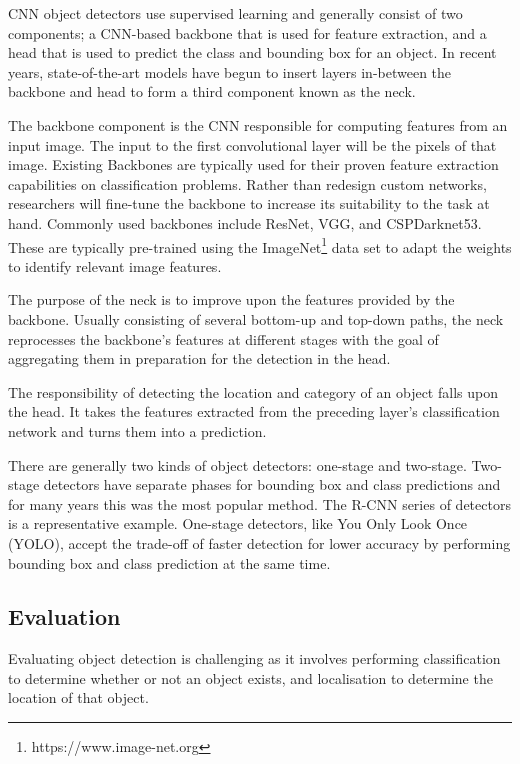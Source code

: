 \documentclass{thesis}
\begin{document}
CNN object detectors use supervised learning and generally consist of two components; a CNN-based backbone that is used for feature extraction, and a head that is used to predict the class and bounding box for an object. In recent years, state-of-the-art models have begun to insert layers in-between the backbone and head to form a third component known as the neck.

The backbone component is the CNN responsible for computing features from an input image. The input to the first convolutional layer will be the pixels of that image. Existing Backbones are typically used for their proven feature extraction capabilities on classification problems. Rather than redesign custom networks, researchers will fine-tune the backbone to increase its suitability to the task at hand. Commonly used backbones include ResNet, VGG, and CSPDarknet53\cite{zhu2021tphyolov5}. These are typically pre-trained using the ImageNet\footnote{https://www.image-net.org} data set to adapt the weights to identify relevant image features\cite{breakdown-yolo4}.

The purpose of the neck is to improve upon the features provided by the backbone. Usually consisting of several bottom-up and top-down paths, the neck reprocesses the backbone's features at different stages with the goal of aggregating them in preparation for the detection in the head.

The responsibility of detecting the location and category of an object falls upon the head. It takes the features extracted from the preceding layer's classification network and turns them into a prediction. 

There are generally two kinds of object detectors: one-stage and two-stage. Two-stage detectors have separate phases for bounding box and class predictions and for many years this was the most popular method. The R-CNN series of detectors\cite{frcnn} is a representative example. One-stage detectors, like You Only Look Once (YOLO), accept the trade-off of faster detection for lower accuracy by performing bounding box and class prediction at the same time.

\subsection{Evaluation}

Evaluating object detection is challenging as it involves performing classification to determine whether or not an object exists, and localisation to determine the location of that object. 
\end{document}
